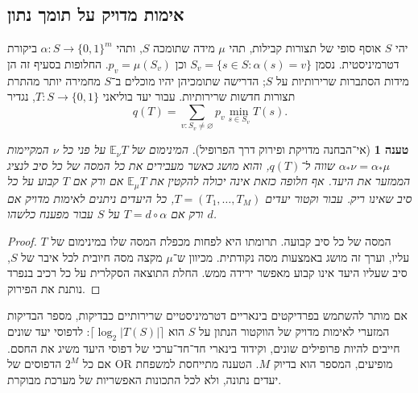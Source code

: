 \documentclass[11pt,a4paper]{article}
\newtheorem{proposition}[theorem]{טענה}
\theoremstyle{definition}
\theoremstyle{remark}
\newcommand{\EN}[1]{\textenglish{#1}}
\newcommand{\bits}{\{0,1\}}
\begin{document}
\subsection{אימות מדויק על תומך נתון}
יהי $S$ אוסף סופי של תצורות קבילות, תהי $\mu$ מידה שתומכה $S$, ותהי $\alpha:S\to\bits^m$ ביקורת דטרמיניסטית. נסמן $S_v=\{s\in S:\alpha(s)=v\}$ וכן $p_v=\mu(S_v)$. החלופות בסעיף זה הן מידות הסתברות שרירותיות על $S$; הדרישה שתומכיהן יהיו מוכלים ב־$S$ מחמירה יותר מהתרת תצורות חדשות שרירותיות. עבור יעד בוליאני $T:S\to\bits$, נגדיר
\[
q(T)=\sum_{v:S_v\ne\varnothing}p_v\min_{s\in S_v}T(s).
\]
\begin{proposition}[אי־הבחנה מדויקת ופירוק דרך הפרופיל]\label{prop:alias}
המינימום של $\mathbb E_\nu T$ על פני כל $\nu$ המקיימות $\alpha_*\nu=\alpha_*\mu$ שווה ל־$q(T)$, והוא מושג כאשר מעבירים את כל המסה של כל סיב לנציג הממזער את היעד. אף חלופה כזאת אינה יכולה להקטין את $\mathbb E_\mu T$ אם ורק אם $T$ קבוע על כל סיב שאינו ריק. עבור וקטור יעדים $T=(T_1,\ldots,T_M)$, כל היעדים ניתנים לאימות מדויק אם ורק אם $T=d\circ\alpha$ על $S$ עבור מפענח כלשהו $d$.
\end{proposition}
\begin{proof}
המסה של כל סיב קבועה. תרומתו היא לפחות מכפלת המסה שלו במינימום של $T$ עליו, וערך זה מושג באמצעות מסה נקודתית. מכיוון ש־$\mu$ מקצה מסה חיובית לכל איבר של $S$, סיב שעליו היעד אינו קבוע מאפשר ירידה ממש. החלת התוצאה הסקלרית על כל רכיב בנפרד נותנת את הפירוק.
\end{proof}
אם מותר להשתמש בפרדיקטים בינאריים דטרמיניסטיים שרירותיים כבדיקות, מספר הבדיקות המזערי לאימות מדויק של הווקטור הנתון על $S$ הוא $\lceil\log_2|T(S)|\rceil$: לדפוסי יעד שונים חייבים להיות פרופילים שונים, וקידוד בינארי חד־חד־ערכי של דפוסי היעד משיג את החסם. אם כל $2^M$ הדפוסים של \EN{OR} מופיעים, המספר הוא בדיוק $M$. הטענה מתייחסת למשפחת יעדים נתונה, ולא לכל התכונות האפשריות של מערכת מבוקרת.
\end{document}
